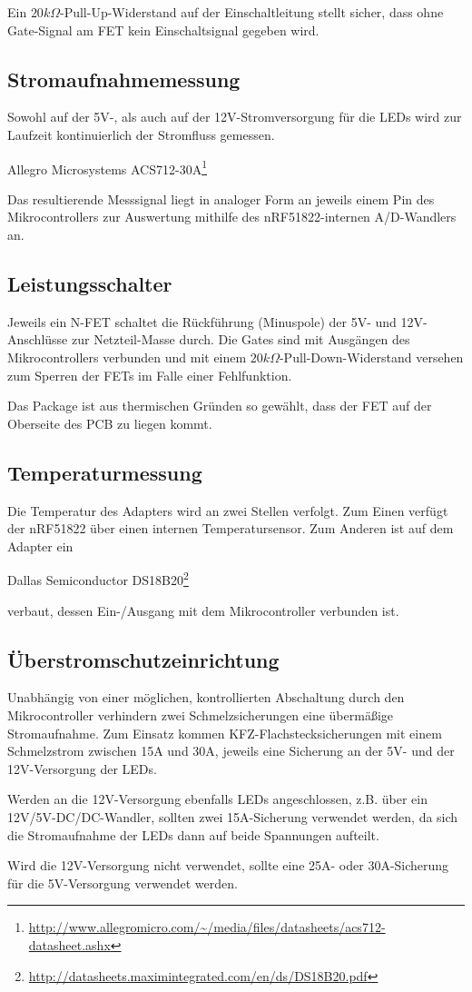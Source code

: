 Ein $20k\Omega$-Pull-Up-Widerstand auf der Einschaltleitung
stellt sicher, dass ohne Gate-Signal am FET
kein Einschaltsignal gegeben wird.

\subsection{Stromaufnahmemessung}
Sowohl auf der 5V-,
als auch auf der 12V-Stromversorgung
f\"ur die LEDs
wird zur Laufzeit kontinuierlich
der Stromfluss gemessen.

\begin{center}
Allegro Microsystems ACS712-30A\footnote{\url{http://www.allegromicro.com/~/media/files/datasheets/acs712-datasheet.ashx}}
\end{center}
Das resultierende Messsignal liegt
in analoger Form
an jeweils einem Pin des Mikrocontrollers
zur Auswertung
mithilfe des nRF51822-internen A/D-Wandlers
an.

\subsection{Leistungsschalter}
Jeweils ein N-FET schaltet die R\"uckf\"uhrung (Minuspole)
der 5V- und 12V-Anschl\"usse zur Netzteil-Masse durch.
Die Gates sind mit Ausg\"angen des Mikrocontrollers verbunden
und mit einem $20k\Omega$-Pull-Down-Widerstand versehen
zum Sperren der FETs
im Falle einer Fehlfunktion.

Das Package ist
aus thermischen Gr\"unden
so gew\"ahlt,
dass der FET auf der Oberseite des PCB
zu liegen kommt.

\subsection{Temperaturmessung}
Die Temperatur des Adapters wird an zwei Stellen verfolgt.
Zum Einen verf\"ugt der nRF51822 \"uber einen internen Temperatursensor.
Zum Anderen ist auf dem Adapter ein
\begin{center}
	Dallas Semiconductor DS18B20\footnote{\url{http://datasheets.maximintegrated.com/en/ds/DS18B20.pdf}}
\end{center}
verbaut,
dessen Ein-/Ausgang
mit dem Mikrocontroller verbunden ist.

\subsection{\"Uberstromschutzeinrichtung}
Unabh\"angig von einer m\"oglichen, kontrollierten Abschaltung durch den Mikrocontroller
verhindern zwei Schmelzsicherungen eine \"uberm\"a{\ss}ige Stromaufnahme.
Zum Einsatz kommen KFZ-Flachstecksicherungen mit einem Schmelzstrom zwischen 15A und 30A,
jeweils eine Sicherung an der 5V- und der 12V-Versorgung der LEDs.

Werden an die 12V-Versorgung ebenfalls LEDs angeschlossen,
z.B. \"uber ein 12V/5V-DC/DC-Wandler,
sollten zwei 15A-Sicherung verwendet werden,
da sich die Stromaufnahme der LEDs
dann auf beide Spannungen aufteilt.

Wird die 12V-Versorgung nicht verwendet,
sollte eine 25A- oder 30A-Sicherung
f\"ur die 5V-Versorgung verwendet werden.
